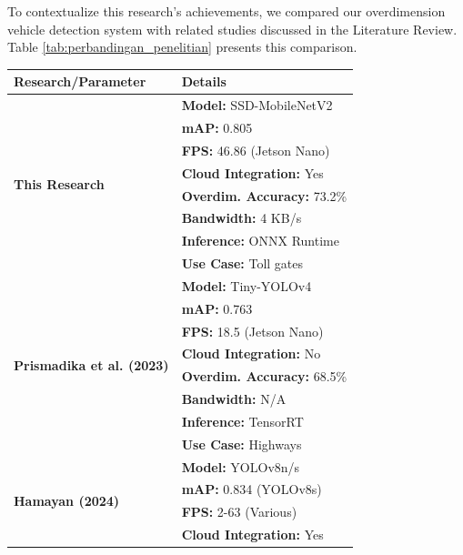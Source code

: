 To contextualize this research's achievements, we compared our overdimension vehicle detection system with related studies discussed in the Literature Review. Table \ref{tab:perbandingan_penelitian} presents this comparison.

\begin{table}[htbp]
  \centering
  \setlength{\tabcolsep}{4pt}
  \footnotesize
  \begin{tabular}{|l|l|}
    \hline
    \rowcolor[HTML]{C0C0C0}
    \textbf{Research/Parameter} & \textbf{Details} \\
    \hline
    \multirow{8}{*}{\textbf{This Research}} & \textbf{Model:} SSD-MobileNetV2 \\
    \cline{2-2}
    & \textbf{mAP:} 0.805 \\
    \cline{2-2}
    & \textbf{FPS:} 46.86 (Jetson Nano) \\
    \cline{2-2}
    & \textbf{Cloud Integration:} Yes \\
    \cline{2-2}
    & \textbf{Overdim. Accuracy:} 73.2\% \\
    \cline{2-2}
    & \textbf{Bandwidth:} 4 KB/s \\
    \cline{2-2}
    & \textbf{Inference:} ONNX Runtime \\
    \cline{2-2}
    & \textbf{Use Case:} Toll gates \\
    \hline
    \multirow{8}{*}{\textbf{Prismadika et al. (2023) \cite{prismadika2023}}} & \textbf{Model:} Tiny-YOLOv4 \\
    \cline{2-2}
    & \textbf{mAP:} 0.763 \\
    \cline{2-2}
    & \textbf{FPS:} 18.5 (Jetson Nano) \\
    \cline{2-2}
    & \textbf{Cloud Integration:} No \\
    \cline{2-2}
    & \textbf{Overdim. Accuracy:} 68.5\% \\
    \cline{2-2}
    & \textbf{Bandwidth:} N/A \\
    \cline{2-2}
    & \textbf{Inference:} TensorRT \\
    \cline{2-2}
    & \textbf{Use Case:} Highways \\
    \hline
    \multirow{8}{*}{\textbf{Hamayan (2024) \cite{hamayan2024}}} & \textbf{Model:} YOLOv8n/s \\
    \cline{2-2}
    & \textbf{mAP:} 0.834 (YOLOv8s) \\
    \cline{2-2}
    & \textbf{FPS:} 2-63 (Various) \\
    \cline{2-2}
    & \textbf{Cloud Integration:} Yes \\

\end{tabular}
\end{table}
